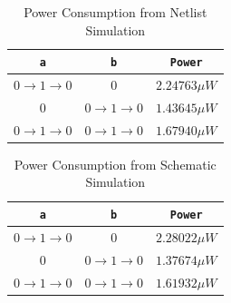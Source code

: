 \documentclass{article}
\begin{document}
	\begin{table}[H]
	\begin{center}
	\caption{Power Consumption from Netlist Simulation}
	\label{table::nor_gate_power_analysis}
	\begin{tabular}{| c | c | c |}
		\hline
		\texttt{a} & \texttt{b} & \texttt{Power}\\
		\hline	
		$0 \rightarrow 1 \rightarrow 0$ & $0$ & $2.24763{\mu}W$ \\
		\hline	
		$0$ & $0 \rightarrow 1 \rightarrow 0$ & $1.43645{\mu}W$ \\
		\hline	
		$0 \rightarrow 1 \rightarrow 0$ & $0 \rightarrow 1 \rightarrow 0$ & $1.67940{\mu}W$\\
		\hline
	\end{tabular}
	\end{center}
	\end{table}
	
	\begin{table}[H]
	\begin{center}
	\caption{Power Consumption from Schematic Simulation}
	\label{table::nor_gate_power_analysis_schem}
	\begin{tabular}{| c | c | c |}
		\hline
		\texttt{a} & \texttt{b} & \texttt{Power}\\
		\hline	
		$0 \rightarrow 1 \rightarrow 0$ & $0$ & $2.28022{\mu}W$ \\
		\hline	
		$0$ & $0 \rightarrow 1 \rightarrow 0$ & $1.37674{\mu}W$ \\
		\hline	
		$0 \rightarrow 1 \rightarrow 0$ & $0 \rightarrow 1 \rightarrow 0$ & $1.61932{\mu}W$\\
		\hline
	\end{tabular}
	\end{center}
	\end{table}
	
	
	
\end{document}
